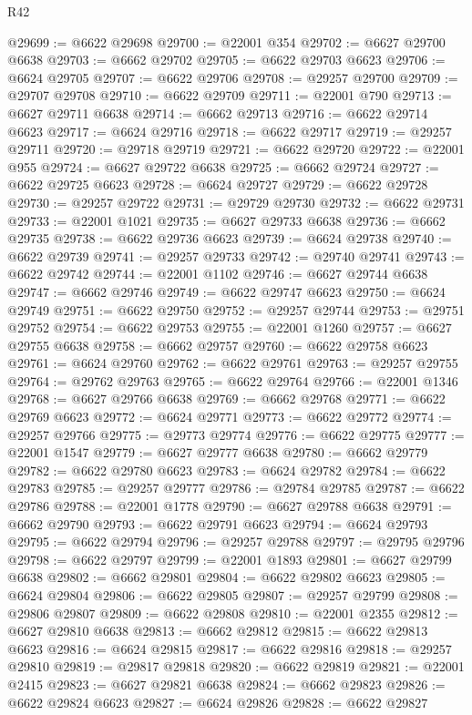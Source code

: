 \begin{lexlean}{R42}
\begin{coremodule}
{@29699 := @6622 @29698
@29700 := @22001 @354
@29702 := @6627 @29700 @6638
@29703 := @6662 @29702
@29705 := @6622 @29703 @6623
@29706 := @6624 @29705
@29707 := @6622 @29706
@29708 := @29257 @29700
@29709 := @29707 @29708
@29710 := @6622 @29709
@29711 := @22001 @790
@29713 := @6627 @29711 @6638
@29714 := @6662 @29713
@29716 := @6622 @29714 @6623
@29717 := @6624 @29716
@29718 := @6622 @29717
@29719 := @29257 @29711
@29720 := @29718 @29719
@29721 := @6622 @29720
@29722 := @22001 @955
@29724 := @6627 @29722 @6638
@29725 := @6662 @29724
@29727 := @6622 @29725 @6623
@29728 := @6624 @29727
@29729 := @6622 @29728
@29730 := @29257 @29722
@29731 := @29729 @29730
@29732 := @6622 @29731
@29733 := @22001 @1021
@29735 := @6627 @29733 @6638
@29736 := @6662 @29735
@29738 := @6622 @29736 @6623
@29739 := @6624 @29738
@29740 := @6622 @29739
@29741 := @29257 @29733
@29742 := @29740 @29741
@29743 := @6622 @29742
@29744 := @22001 @1102
@29746 := @6627 @29744 @6638
@29747 := @6662 @29746
@29749 := @6622 @29747 @6623
@29750 := @6624 @29749
@29751 := @6622 @29750
@29752 := @29257 @29744
@29753 := @29751 @29752
@29754 := @6622 @29753
@29755 := @22001 @1260
@29757 := @6627 @29755 @6638
@29758 := @6662 @29757
@29760 := @6622 @29758 @6623
@29761 := @6624 @29760
@29762 := @6622 @29761
@29763 := @29257 @29755
@29764 := @29762 @29763
@29765 := @6622 @29764
@29766 := @22001 @1346
@29768 := @6627 @29766 @6638
@29769 := @6662 @29768
@29771 := @6622 @29769 @6623
@29772 := @6624 @29771
@29773 := @6622 @29772
@29774 := @29257 @29766
@29775 := @29773 @29774
@29776 := @6622 @29775
@29777 := @22001 @1547
@29779 := @6627 @29777 @6638
@29780 := @6662 @29779
@29782 := @6622 @29780 @6623
@29783 := @6624 @29782
@29784 := @6622 @29783
@29785 := @29257 @29777
@29786 := @29784 @29785
@29787 := @6622 @29786
@29788 := @22001 @1778
@29790 := @6627 @29788 @6638
@29791 := @6662 @29790
@29793 := @6622 @29791 @6623
@29794 := @6624 @29793
@29795 := @6622 @29794
@29796 := @29257 @29788
@29797 := @29795 @29796
@29798 := @6622 @29797
@29799 := @22001 @1893
@29801 := @6627 @29799 @6638
@29802 := @6662 @29801
@29804 := @6622 @29802 @6623
@29805 := @6624 @29804
@29806 := @6622 @29805
@29807 := @29257 @29799
@29808 := @29806 @29807
@29809 := @6622 @29808
@29810 := @22001 @2355
@29812 := @6627 @29810 @6638
@29813 := @6662 @29812
@29815 := @6622 @29813 @6623
@29816 := @6624 @29815
@29817 := @6622 @29816
@29818 := @29257 @29810
@29819 := @29817 @29818
@29820 := @6622 @29819
@29821 := @22001 @2415
@29823 := @6627 @29821 @6638
@29824 := @6662 @29823
@29826 := @6622 @29824 @6623
@29827 := @6624 @29826
@29828 := @6622 @29827
}
\end{coremodule}
\end{lexlean}
